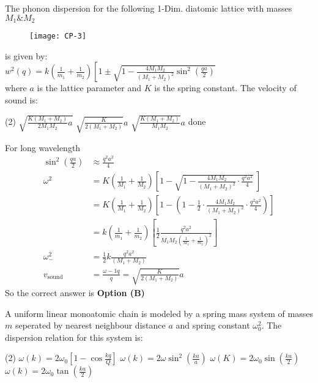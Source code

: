 \begin{exercise}
	The phonon dispersion for the following 1-Dim. diatomic lattice with masses $M_{1} \& M_{2}$
	\begin{figure}[H]
		\centering
		\texttt{[image: CP-3]}
	\end{figure}
	is given by:\\
	$w^{2}(q)=k\left(\frac{1}{m_{1}}+\frac{1}{m_{2}}\right)\left[1 \pm \sqrt{1-\frac{4 M_{1} M_{2}}{\left(M_{1}+M_{2}\right)^{2}} \sin ^{2}\left(\frac{q a}{2}\right)}\right.$\\
	where $a$ is the lattice parameter and $K$ is the spring constant. The velocity of sound is:
\end{exercise}
 \begin{tasks}(2)
	\task[\textbf{a.}]$\sqrt{\frac{K\left(M_{1}+M_{2}\right)}{2 M_{1} M_{2}} a}$
	\task[\textbf{b.}]$\sqrt{\frac{K}{2\left(M_{1}+M_{2}\right)}} a$
	\task[\textbf{c.}]$\sqrt{\frac{K\left(M_{1}+M_{2}\right)}{M_{1} M_{2}}} a$
	\task[\textbf{d.}] done
\end{tasks}
\begin{answer}
	For long wavelength
	\begin{align*}
	\sin ^{2}\left(\frac{q a}{2}\right) &\approx \frac{q^{2} a^{2}}{4}\\
	\omega^{2}&=K\left(\frac{1}{M_{1}}+\frac{1}{M_{2}}\right)\left[1-\sqrt{1-\frac{4 M_{1} M_{2}}{\left(M_{1}+M_{2}\right)^{2}} \cdot \frac{q^{2} a^{2}}{4}}\ \right]\\
	&=K\left(\frac{1}{M_{1}}+\frac{1}{M_{2}}\right)\left[1-\left(1-\frac{1}{2} \cdot \frac{4 M_{1} M_{2}}{\left(M_{1}+M_{2}\right)^{2}} \cdot \frac{q^{2} a^{2}}{4}\right)\right]\\
	&=k\left(\frac{1}{m_{1}}+\frac{1}{m_{2}}\right)\left[\frac{1}{2} \frac{q^{2} a^{2}}{M_{1} M_{2}\left(\frac{1}{M_{1}}+\frac{1}{m_{2}}\right)^{2}}\right]\\
	\omega_{-}^{2}&=\frac{1}{2} k \frac{q^{2} a^{2}}{\left(M_{1}+M_{2}\right)}\\
	v_{\text {sound }}&=\frac{\omega-1 q}{q}=\sqrt{\frac{K}{2\left(M_{1}+M_{2}\right)}} a
	\end{align*}
	So the correct answer is \textbf{Option (B)}
\end{answer}
\begin{exercise}
	 A uniform linear monoatomic chain is modeled by a spring mass system of masses $m$ seperated by nearest neighbour distance $a$ and spring constant $\omega_{0}^{2}$. The dispersion relation for this system is:
	  \begin{tasks}(2)
	 	\task[\textbf{a.}]$\omega(k)=2 \omega_{0}\left[1-\cos \frac{k q}{Q}\right]$
	 	\task[\textbf{b.}]$\omega(k)=2 \omega \sin ^{2}\left(\frac{k a}{a}\right)$
	 	\task[\textbf{c.}]$\omega(K)=2 \omega_{0} \sin \left(\frac{k a}{2}\right)$
	 	\task[\textbf{d.}] $\omega(k)=2 \omega_{0} \tan \left(\frac{k a}{2}\right)$
	 \end{tasks}
\end{exercise}
